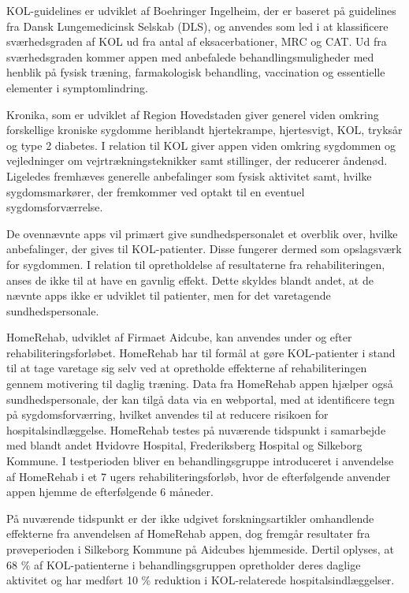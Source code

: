 KOL-guidelines er udviklet af Boehringer Ingelheim, der er baseret på guidelines fra Dansk Lungemedicinsk Selskab (DLS), og anvendes som led i at klassificere sværhedsgraden af KOL ud fra antal af eksacerbationer, MRC og CAT. Ud fra sværhedsgraden kommer appen med anbefalede behandlingsmuligheder med henblik på fysisk træning, farmakologisk behandling, vaccination og essentielle elementer i symptomlindring.\cite{KOLguidelines2012}    

Kronika, som er udviklet af Region Hovedstaden giver generel viden omkring forskellige kroniske sygdomme heriblandt hjertekrampe, hjertesvigt, KOL, tryksår og type 2 diabetes. I relation til KOL giver appen viden omkring sygdommen og vejledninger om vejrtrækningsteknikker samt stillinger, der reducerer åndenød. Ligeledes fremhæves generelle anbefalinger som fysisk aktivitet samt,  hvilke sygdomsmarkører, der fremkommer ved optakt til en eventuel sygdomsforværrelse.\cite{Kronika2014}    

De ovennævnte apps vil primært give sundhedspersonalet et overblik over, hvilke anbefalinger, der gives til KOL-patienter. Disse fungerer dermed som opslagsværk for sygdommen. I relation til opretholdelse af resultaterne fra rehabiliteringen, anses de ikke til at have en gavnlig effekt. 
Dette skyldes blandt andet, at de nævnte apps ikke er udviklet til patienter, men for det varetagende sundhedspersonale.\cite{Kronika2014}  

HomeRehab, udviklet af Firmaet Aidcube, kan anvendes under og efter rehabiliteringsforløbet. HomeRehab har til formål at gøre KOL-patienter i stand til at tage varetage sig selv ved at opretholde effekterne af rehabiliteringen gennem motivering til daglig træning. Data fra HomeRehab appen hjælper også sundhedspersonale, der kan tilgå data via en webportal, med at identificere tegn på sygdomsforværring, hvilket anvendes til at reducere risikoen for hospitalsindlæggelse. HomeRehab testes på nuværende tidspunkt i samarbejde med blandt andet Hvidovre Hospital, Frederiksberg Hospital og Silkeborg Kommune. 
I testperioden bliver en behandlingsgruppe introduceret i anvendelse af HomeRehab i et 7 ugers rehabiliteringsforløb, hvor de efterfølgende anvender appen hjemme de efterfølgende 6 måneder.\cite{HealthcareDenmark2017}

På nuværende tidspunkt er der ikke udgivet forskningsartikler omhandlende effekterne fra anvendelsen af HomeRehab appen, dog fremgår resultater fra prøveperioden i Silkeborg Kommune på Aidcubes hjemmeside. Dertil oplyses, at 68 \% af KOL-patienterne i behandlingsgruppen opretholder deres daglige aktivitet og har medført 10 \% reduktion i KOL-relaterede hospitalsindlæggelser.\cite{AidCube2017}
